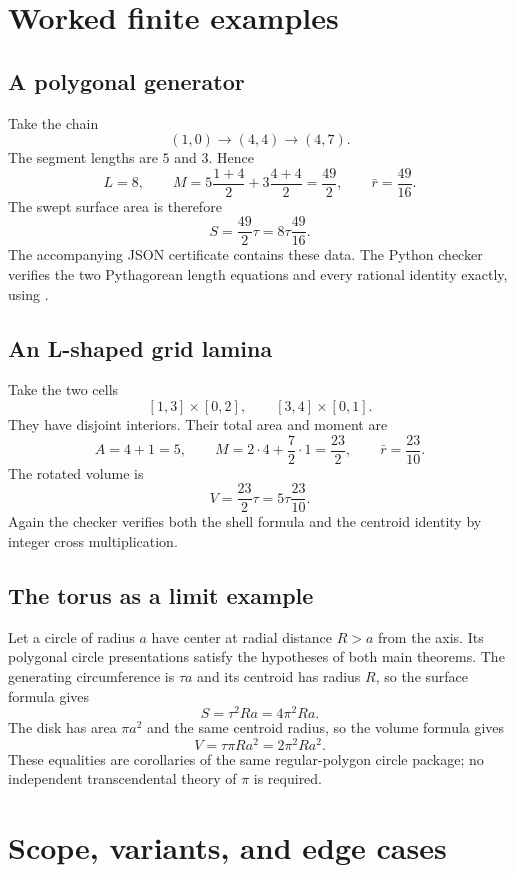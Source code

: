 \documentclass[11pt]{article}
\theoremstyle{definition}
\newcommand{\code}[1]{\texttt{\detokenize{#1}}}
\begin{document}
\section{Worked finite examples}
\label{sec:examples}

\subsection{A polygonal generator}

Take the chain
\[
 (1,0)\longrightarrow(4,4)\longrightarrow(4,7).
\]
The segment lengths are $5$ and $3$.  Hence
\[
 L=8,
 \qquad
 M=5\frac{1+4}{2}+3\frac{4+4}{2}
   =\frac{49}{2},
 \qquad
 \bar r=\frac{49}{16}.
\]
The swept surface area is therefore
\[
 S=\frac{49}{2}\tau=8\tau\frac{49}{16}.
\]
The accompanying JSON certificate contains these data.  The Python checker
verifies the two Pythagorean length equations and every rational identity
exactly, using \code{fractions.Fraction}.

\subsection{An L-shaped grid lamina}

Take the two cells
\[
 [1,3]\times[0,2],
 \qquad
 [3,4]\times[0,1].
\]
They have disjoint interiors.  Their total area and moment are
\[
 A=4+1=5,
 \qquad
 M=2\cdot4+\frac72\cdot1=\frac{23}{2},
 \qquad
 \bar r=\frac{23}{10}.
\]
The rotated volume is
\[
 V=\frac{23}{2}\tau=5\tau\frac{23}{10}.
\]
Again the checker verifies both the shell formula and the centroid identity by
integer cross multiplication.

\subsection{The torus as a limit example}

Let a circle of radius $a$ have center at radial distance $R>a$ from the axis.
Its polygonal circle presentations satisfy the hypotheses of both main
theorems.  The generating circumference is $\tau a$ and its centroid has
radius $R$, so the surface formula gives
\[
 S=\tau^2Ra=4\pi^2Ra.
\]
The disk has area $\pi a^2$ and the same centroid radius, so the volume formula
gives
\[
 V=\tau\pi Ra^2=2\pi^2Ra^2.
\]
These equalities are corollaries of the same regular-polygon circle package;
no independent transcendental theory of $\pi$ is required.

\section{Scope, variants, and edge cases}
\label{sec:scope}
\end{document}
